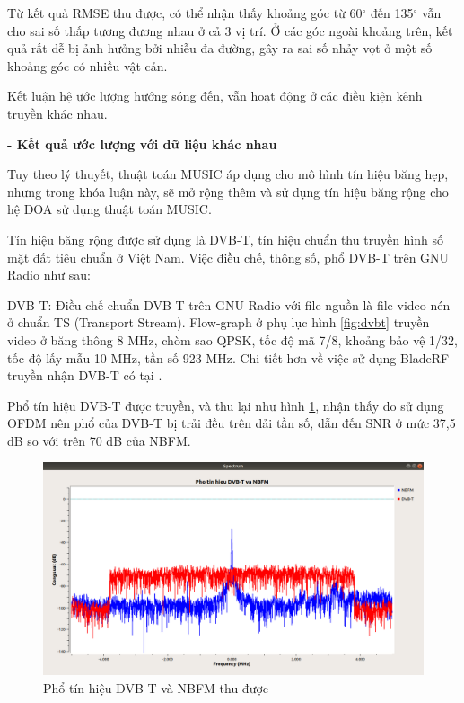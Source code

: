 Từ kết quả RMSE thu được, có thể nhận thấy khoảng góc từ 60$^{\circ}$ đến 135$^{\circ}$ vẫn cho sai số thấp tương đương nhau ở cả 3 vị trí. Ở các góc ngoài khoảng trên, kết quả rất dễ bị ảnh hưởng bởi nhiễu đa đường, gây ra sai số nhảy vọt ở một số khoảng góc có nhiều vật cản.

Kết luận hệ ước lượng hướng sóng đến, vẫn hoạt động ở các điều kiện kênh truyền khác nhau.

\textbf{- Kết quả ước lượng với dữ liệu khác nhau}

Tuy theo lý thuyết, thuật toán MUSIC áp dụng cho mô hình tín hiệu băng hẹp, nhưng trong khóa luận này, sẽ mở rộng thêm và sử dụng tín hiệu băng rộng cho hệ DOA sử dụng thuật toán MUSIC.

Tín hiệu băng rộng được sử dụng là DVB-T, tín hiệu chuẩn thu truyền hình số mặt đất tiêu chuẩn ở Việt Nam. Việc điều chế, thông số, phổ DVB-T trên GNU Radio như sau: 

DVB-T: Điều chế chuẩn DVB-T trên GNU Radio với file nguồn là file video nén ở chuẩn TS (Transport Stream). Flow-graph ở phụ lục hình \ref{fig:dvbt} truyền video ở băng thông 8 MHz, chòm sao QPSK, tốc độ mã 7/8, khoảng bảo vệ 1/32, tốc độ lấy mẫu 10 MHz, tần số 923 MHz. Chi tiết hơn về việc sử dụng BladeRF truyền nhận DVB-T có tại \cite{BogdanDIA2015}.

Phổ tín hiệu DVB-T được truyền, và thu lại như hình \ref{fig:spectrum}, nhận thấy do sử dụng OFDM nên phổ của DVB-T bị trải đều trên dải tần số, dẫn đến SNR ở mức 37,5 dB so với trên 70 dB của NBFM.

\begin{figure} [!h]
	\centering
	\includegraphics[width=1\linewidth]{figures/spectrum2.png}
	\caption{Phổ tín hiệu DVB-T và NBFM thu được}
	\label{fig:spectrum}
\end{figure}

